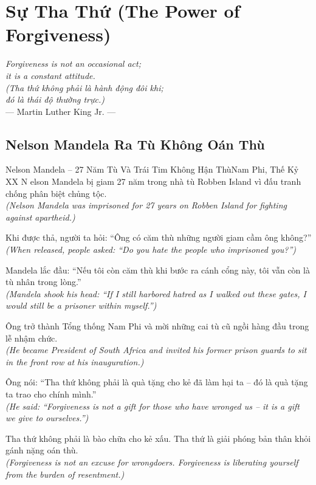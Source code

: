 \chapter{Sự Tha Thứ (The Power of Forgiveness)}
\begin{center}
  \textit{\color{truyenblue}Forgiveness is not an occasional act;\\
  it is a constant attitude.}\\
  \textit{(Tha thứ không phải là hành động đôi khi;\\
  đó là thái độ thường trực.)}\\[4pt]
  \small\color{truyengold}--- Martin Luther King Jr. ---
\end{center}
\ngancach

\section{Nelson Mandela Ra Tù Không Oán Thù}
\begin{truyen}{Nelson Mandela -- 27 Năm Tù Và Trái Tim Không Hận Thù}{Nam Phi, Thế Kỷ XX}
N elson Mandela bị giam 27 năm trong nhà tù Robben Island vì đấu tranh chống phân biệt chủng tộc.\\
\textit{(Nelson Mandela was imprisoned for 27 years on Robben Island for fighting against apartheid.)}

Khi được thả, người ta hỏi: ``Ông có căm thù những người giam cầm ông không?''\\
\textit{(When released, people asked: ``Do you hate the people who imprisoned you?'')}

Mandela lắc đầu: ``Nếu tôi còn căm thù khi bước ra cánh cổng này, tôi vẫn còn là tù nhân trong lòng.''\\
\textit{(Mandela shook his head: ``If I still harbored hatred as I walked out these gates, I would still be a prisoner within myself.'')}

Ông trở thành Tổng thống Nam Phi và mời những cai tù cũ ngồi hàng đầu trong lễ nhậm chức.\\
\textit{(He became President of South Africa and invited his former prison guards to sit in the front row at his inauguration.)}

Ông nói: ``Tha thứ không phải là quà tặng cho kẻ đã làm hại ta -- đó là quà tặng ta trao cho chính mình.''\\
\textit{(He said: ``Forgiveness is not a gift for those who have wronged us -- it is a gift we give to ourselves.'')}

\end{truyen}
\begin{baihoc}
  Tha thứ không phải là bào chữa cho kẻ xấu. Tha thứ là giải phóng bản thân khỏi gánh nặng oán thù.\\
  \textit{(Forgiveness is not an excuse for wrongdoers. Forgiveness is liberating yourself from the burden of resentment.)}
\end{baihoc}

